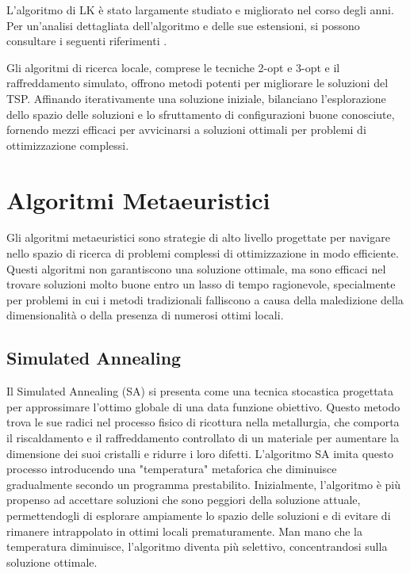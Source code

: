 L'algoritmo di \gls{LK} è stato largamente studiato e migliorato nel corso degli anni. Per un'analisi dettagliata dell'algoritmo e delle sue estensioni, si possono consultare i seguenti riferimenti \cite{Johnson2002,Lawler1985,Gutin2016}.


Gli algoritmi di ricerca locale, comprese le tecniche 2-opt e 3-opt e il raffreddamento simulato, offrono metodi potenti per migliorare le soluzioni del \gls{TSP}. Affinando iterativamente una soluzione iniziale, bilanciano l'esplorazione dello spazio delle soluzioni e lo sfruttamento di configurazioni buone conosciute, fornendo mezzi efficaci per avvicinarsi a soluzioni ottimali per problemi di ottimizzazione complessi.


\section{Algoritmi Metaeuristici}

Gli algoritmi metaeuristici sono strategie di alto livello progettate per navigare nello spazio di ricerca di problemi complessi di ottimizzazione in modo efficiente. Questi algoritmi non garantiscono una soluzione ottimale, ma sono efficaci nel trovare soluzioni molto buone entro un lasso di tempo ragionevole, specialmente per problemi in cui i metodi tradizionali falliscono a causa della maledizione della dimensionalità o della presenza di numerosi ottimi locali.

\subsection{Simulated Annealing}

Il Simulated Annealing (\gls{SA}) si presenta come una tecnica stocastica progettata per approssimare l'ottimo globale di una data funzione obiettivo. Questo metodo trova le sue radici nel processo fisico di ricottura nella metallurgia, che comporta il riscaldamento e il raffreddamento controllato di un materiale per aumentare la dimensione dei suoi cristalli e ridurre i loro difetti. L'algoritmo SA imita questo processo introducendo una "temperatura" metaforica che diminuisce gradualmente secondo un programma prestabilito. Inizialmente, l'algoritmo è più propenso ad accettare soluzioni che sono peggiori della soluzione attuale, permettendogli di esplorare ampiamente lo spazio delle soluzioni e di evitare di rimanere intrappolato in ottimi locali prematuramente. Man mano che la temperatura diminuisce, l'algoritmo diventa più selettivo, concentrandosi sulla soluzione ottimale.

